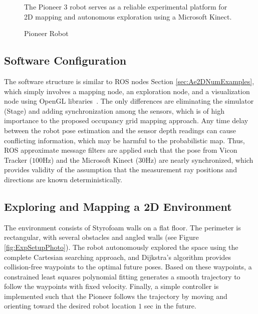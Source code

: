 \begin{figure}
\caption{Pioneer Robot}
	\medskip
	\small
	The Pioneer 3 robot serves as a reliable experimental platform for 2D mapping and autonomous exploration using a Microsoft Kinect.
\label{fig:Pioneer}
\end{figure}

\subsection{Software Configuration}

The software structure is similar to ROS nodes Section \ref{sec:Ae2DNumExamples}, which simply involves a mapping node, an exploration node, and a visualization node using OpenGL libraries~\cite{openGL}. The only differences are eliminating the simulator (Stage) and adding synchronization among the sensors, which is of high importance to the proposed occupancy grid mapping approach. Any time delay between the robot pose estimation and the sensor depth readings can cause conflicting information, which may be harmful to the probabilistic map. Thus, ROS approximate message filters are applied such that the pose from Vicon Tracker ($100$Hz) and the Microsoft Kinect ($30$Hz) are nearly synchronized, which provides validity of the assumption that the measurement ray positions and directions are known deterministically.

\subsection{Exploring and Mapping a 2D Environment}
The environment consists of Styrofoam walls on a flat floor. The perimeter is rectangular, with several obstacles and angled walls (see Figure \ref{fig:ExpSetupPhoto}). The robot autonomously explored the space using the complete Cartesian searching approach, and Dijkstra's algorithm provides collision-free waypoints to the optimal future poses. Based on these waypoints, a constrained least squares polynomial fitting generates a smooth trajectory to follow the waypoints with fixed velocity. Finally, a simple controller is implemented such that the Pioneer follows the trajectory by moving and orienting toward the desired robot location $1$ sec in the future.

